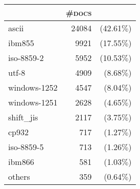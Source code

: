 \begin{tabular}{lrr} 
 \toprule 
 & \textsc{\#docs} & \\ 
 \midrule 
ascii&24084 &(42.61$\%$)\\ 
  ibm855&9921 &(17.55$\%$)\\ 
  iso-8859-2&5952 &(10.53$\%$)\\ 
  utf-8&4909 &(8.68$\%$)\\ 
  windows-1252&4547 &(8.04$\%$)\\ 
  windows-1251&2628 &(4.65$\%$)\\ 
  shift\_jis&2117 &(3.75$\%$)\\ 
  cp932&717 &(1.27$\%$)\\ 
  iso-8859-5&713 &(1.26$\%$)\\ 
  ibm866&581 &(1.03$\%$)\\ 
  \bottomrule 
others&359 &(0.64$\%$)\\ 
  \bottomrule 
 \end{tabular}